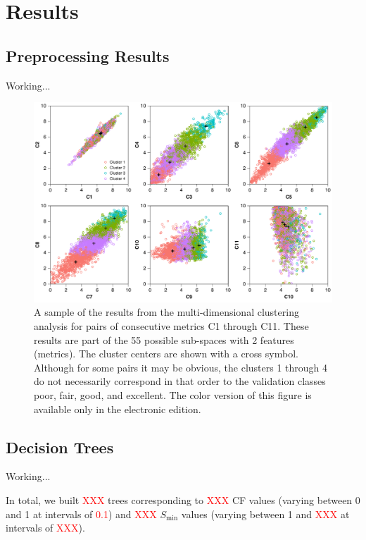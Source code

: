 
\section{Results}
\label{sec:results}

\subsection{Preprocessing Results}

Working...

\begin{figure}[t]
	\centering
	\includegraphics[width=\textwidth]{figures/pdf/figure-05}
	\caption{A sample of the results from the multi-dimensional clustering analysis for pairs of consecutive metrics C1 through C11. These results are part of the 55 possible sub-spaces with 2 features (metrics). The cluster centers are shown with a cross symbol. Although for some pairs it may be obvious, the clusters 1 through 4 do not necessarily correspond in that order to the validation classes poor, fair, good, and excellent. The color version of this figure is available only in the electronic edition.}
	\label{fig:clusters-sample}
\end{figure}

\subsection{Decision Trees}

Working...

In total, we built \textcolor{red}{XXX} trees corresponding to \textcolor{red}{XXX} CF values (varying between 0 and 1 at intervals of \textcolor{red}{0.1}) and \textcolor{red}{XXX} $S_{\min}$ values (varying between 1 and \textcolor{red}{XXX} at intervals of \textcolor{red}{XXX}). 


% 

% 
